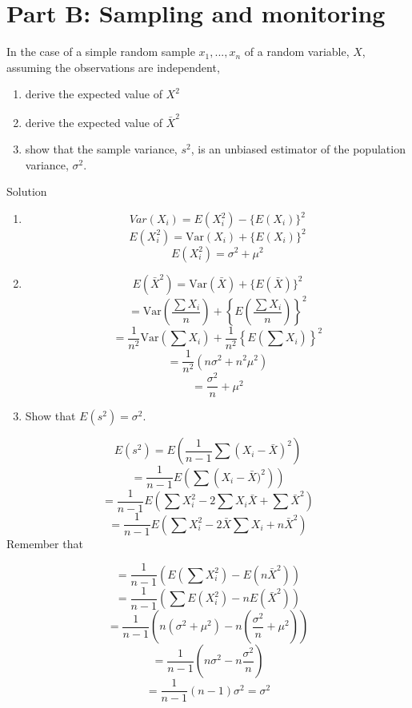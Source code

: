 \documentclass[
  letterpaper,
  DIV=11,
  numbers=noendperiod,
  oneside]{scrartcl}
\providecommand{\tightlist}{%
  \setlength{\itemsep}{0pt}\setlength{\parskip}{0pt}}\usepackage{longtable,booktabs,array}
\begin{document}
\section{Part B: Sampling and
monitoring}\label{part-b-sampling-and-monitoring}

\begin{tcolorbox}[enhanced jigsaw, bottomrule=.15mm, breakable, bottomtitle=1mm, colback=white, titlerule=0mm, colbacktitle=quarto-callout-tip-color!10!white, rightrule=.15mm, toptitle=1mm, left=2mm, opacityback=0, toprule=.15mm, arc=.35mm, title={Task 7}, colframe=quarto-callout-tip-color-frame, coltitle=black, leftrule=.75mm, opacitybacktitle=0.6]

In the case of a simple random sample \(x_1,..., x_n\) of a random
variable, \(X\), assuming the observations are independent,

\begin{enumerate}
\def\labelenumi{(\alph{enumi})}
\tightlist
\item
  derive the expected value of \(X^2\)
\item
  derive the expected value of \(\bar{X}^2\)
\item
  show that the sample variance, \(s^2\), is an unbiased estimator of
  the population variance, \(\sigma^2\).
\end{enumerate}

Solution

\begin{enumerate}
\def\labelenumi{(\alph{enumi})}
\item
  \[Var(X_i) = E(X_i^2) - \{E(X_i)\}^2\]
  \[E(X_i^2) = \text{Var}(X_i) + \{E(X_i)\}^2\]
  \[E(X_i^2) = \sigma^2 + \mu^2\]
\item
  \[E(\bar{X}^2) = \text{Var}(\bar{X}) + \{E(\bar{X})\}^2\]
  \[= \text{Var}\left(\frac{\sum X_i}{n}\right) + \left\{ E\left(\frac{\sum X_i}{n}\right)\right\}^2\]
  \[= \frac{1}{n^2}\text{Var}\left(\sum X_i\right) + \frac{1}{n^2} \left\{E\left(\sum X_i\right)\right\}^2\]
  \[=\frac{1}{n^2}(n\sigma^2 + n^2\mu^2)\]
  \[=\frac{\sigma^2}{n} + \mu^2\]
\item
  Show that \(E(s^2) = \sigma^2\).
\end{enumerate}

\[E(s^2) = E\left(\frac{1}{n-1}\sum(X_i - \bar{X})^2 \right)\]
\[=\frac{1}{n-1}E\left(\sum \left(X_i - \bar{X})^2 \right)\right)\]
\[=\frac{1}{n-1}E\left(\sum X_i^2 - 2\sum X_i \bar{X} + \sum\bar{X}^2\right)\]
\[=\frac{1}{n-1}E\left(\sum X_i^2 - 2 \bar{X}\sum X_i + n\bar{X}^2\right)\]
Remember that
{}

\[=\frac{1}{n-1}\left(E\left(\sum X_i^2\right) - E\left(n\bar{X}^2\right)\right)\]
\[=\frac{1}{n-1}\left(\sum E\left(X_i^2\right) - nE\left(\bar{X}^2\right)\right)\]
\[=\frac{1}{n-1}\left(n\left(\sigma^2 + \mu^2\right) - n\left(\frac{\sigma^2}{n} + \mu^2\right)\right)\]
\[=\frac{1}{n-1}\left(n \sigma^2 - n \frac{\sigma^2}{n}\right)\]
\[=\frac{1}{n-1}\left(n-1\right)\sigma^2 = \sigma^2\]

\end{tcolorbox}
\end{document}
